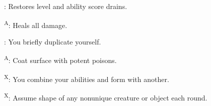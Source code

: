 \begin{enumerate*}
\item {}: Restores level and ability score drains.
\item {}\textsuperscript{A}: Heals all damage. %

: You briefly duplicate yourself.

\textsuperscript{A}: Coat surface with potent poisons. %

\item {}\textsuperscript{X}: You combine your abilities and form with another.
\item {}\textsuperscript{X}: Assume shape of any nonunique creature or object each round.
\end{enumerate*}



